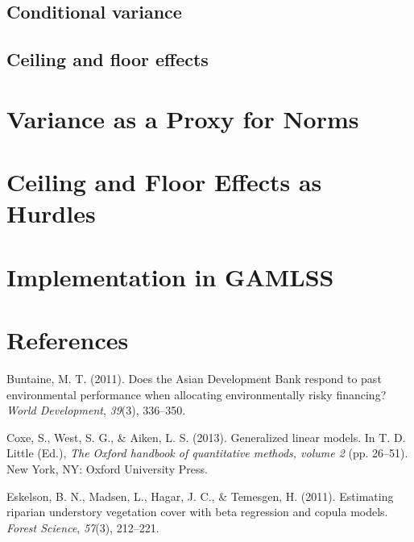 \documentclass[english,man]{apa6}
\theoremstyle{definition}
\theoremstyle{definition}
\theoremstyle{remark}
\begin{document}
\subsection{Conditional variance}\label{conditional-variance}

\subsection{Ceiling and floor effects}\label{ceiling-and-floor-effects}

\section{Variance as a Proxy for
Norms}\label{variance-as-a-proxy-for-norms}

\section{Ceiling and Floor Effects as
Hurdles}\label{ceiling-and-floor-effects-as-hurdles}

\section{Implementation in GAMLSS}\label{implementation-in-gamlss}

\newpage

\section{References}\label{references}

\setlength{\parindent}{-0.5in} \setlength{\leftskip}{0.5in}

\hypertarget{refs}{}
\hypertarget{ref-buntaine2011does}{}
Buntaine, M. T. (2011). Does the Asian Development Bank respond to past
environmental performance when allocating environmentally risky
financing? \emph{World Development}, \emph{39}(3), 336--350.

\hypertarget{ref-coxe2013generalized}{}
Coxe, S., West, S. G., \& Aiken, L. S. (2013). Generalized linear
models. In T. D. Little (Ed.), \emph{The Oxford handbook of quantitative
methods, volume 2} (pp. 26--51). New York, NY: Oxford University Press.

\hypertarget{ref-eskelson2011estimating}{}
Eskelson, B. N., Madsen, L., Hagar, J. C., \& Temesgen, H. (2011).
Estimating riparian understory vegetation cover with beta regression and
copula models. \emph{Forest Science}, \emph{57}(3), 212--221.
\end{document}
